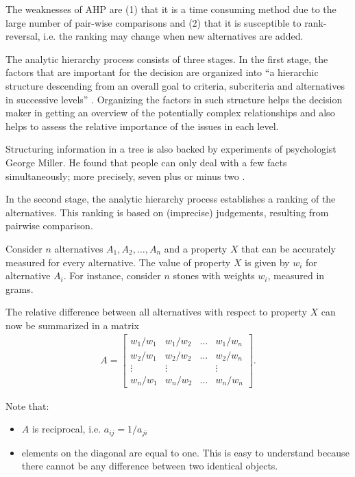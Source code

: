 The weaknesses of AHP are (1) that it is a time consuming method due to the large number of pair-wise comparisons and (2) that it is susceptible to rank-reversal, i.e. the ranking may change  when new alternatives are added.

The analytic hierarchy process consists of three stages. In the first stage, the factors that are important for the decision are organized into ``a hierarchic structure descending from an overall goal to criteria, subcriteria and alternatives in successive levels'' \cite{Saaty:1990}. Organizing the factors in such structure helps the decision maker in getting an overview of the potentially complex relationships and also helps to assess the relative importance of the issues in each level. 

Structuring information in a tree is also backed by experiments of psychologist George Miller. He found that people can only deal with a few facts simultaneously; more precisely, seven plus or minus two \cite{Miller:1956}. 

In the second stage, the analytic hierarchy process establishes a ranking of the alternatives. This ranking is based on (imprecise) judgements, resulting from pairwise comparison. 

Consider $n$ alternatives $A_1, A_2, \ldots, A_n$ and a property $X$ that can be accurately measured for every alternative. The value of property $X$ is given by $w_i$ for alternative $A_i$. For instance, consider $n$ stones with weights $w_i$, measured in grams.

The relative difference between all alternatives with respect to property $X$ can now be summarized in a matrix
\begin{gather}
    A = %
    \begin{bmatrix}
        w_1/w_1 & w_1/w_2 & \ldots & w_1/w_n \\
        w_2/w_1 & w_2/w_2 & \ldots & w_2/w_n \\
        \vdots  & \vdots  &        & \vdots  \\
        w_n/w_1 & w_n/w_2 & \ldots & w_n/w_n    
    \end{bmatrix}.
\end{gather}

Note that:
\begin{itemize}
    \item $A$ is reciprocal, i.e. $a_{ij} = 1 / a_{ji}$
    \item elements on the diagonal are equal to one. This is easy to understand because there cannot be any difference between two identical objects.
\end{itemize}

